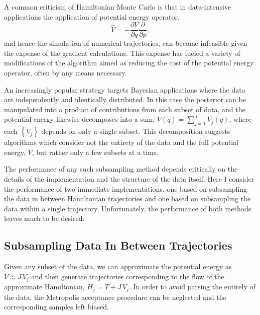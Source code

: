 \documentclass{article}
\begin{document}
A common criticism of Hamiltonian Monte Carlo is that in data-intensive applications 
the application of potential energy operator,
%
\begin{equation*}
\hat{V} = - \frac{ \partial V }{ \partial q } \frac{ \partial }{ \partial p},
\end{equation*}
%
and hence the simulation of numerical trajectories, can become infeasible given the 
expense of the gradient calculations.  This expense has fueled a variety of modifications 
of the algorithm aimed as reducing the cost of the potential energy operator, often by 
any means necessary.

An increasingly popular strategy targets Bayesian applications where the data are 
independently and identically distributed.  In this case the posterior can be manipulated
into a product of contributions from each subset of data, and the potential energy
likewise decomposes into a sum,
%
$V (q) = \sum_{j = 1}^{J} V_{j} (q)$,
%
where each $\left\{ V_{j} \right\}$ depends on only a single subset.  This decomposition 
suggests algorithms which consider not the entirety of the data and the full potential
energy, $V$, but rather only a few subsets at a time.

The performance of any such subsampling method depends critically on the details
of the implementation and the structure of the data itself.  Here I consider the performance 
of two immediate implementations, one based on subsampling the data in between 
Hamiltonian trajectories and one based on subsampling the data within a single trajectory.  
Unfortunately, the performance of both methods leaves much to be desired.

\subsection{Subsampling Data In Between Trajectories}

Given any subset of the data, we can approximate the potential energy as 
$V \approx J \, V_{j}$ and then generate trajectories corresponding to the flow of the 
approximate Hamiltonian, $H_{j} = T + J \, V_{j}$.  In order to avoid parsing the entirely
of the data, the Metropolis acceptance procedure can be neglected and the 
corresponding samples left biased.
\end{document}
